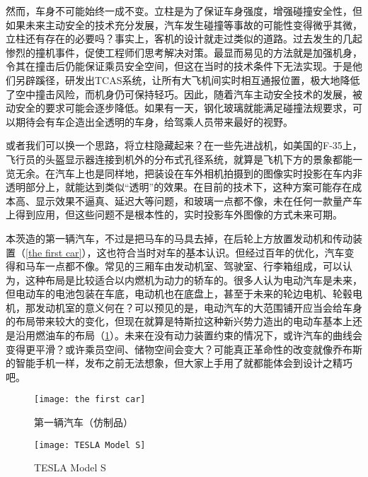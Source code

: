 \documentclass[UTF8]{ctexart}
\numberwithin{figure}{section}
\numberwithin{table}{section}
\begin{document}
然而，车身不可能始终一成不变。立柱是为了保证车身强度，增强碰撞安全性，但如果未来主动安全的技术充分发展，汽车发生碰撞等事故的可能性变得微乎其微，立柱还有存在的必要吗？事实上，客机的设计就走过类似的道路。过去发生的几起惨烈的撞机事件，促使工程师们思考解决对策。最显而易见的方法就是加强机身，令其在撞击后仍能保证乘员安全空间，但这在当时的技术条件下无法实现。于是他们另辟蹊径，研发出TCAS系统，让所有大飞机间实时相互通报位置，极大地降低了空中撞击风险，而机身仍可保持轻巧。因此，随着汽车主动安全技术的发展，被动安全的要求可能会逐步降低。如果有一天，钢化玻璃就能满足碰撞法规要求，可以期待会有车企造出全透明的车身，给驾乘人员带来最好的视野。

或者我们可以换一个思路，将立柱隐藏起来？在一些先进战机，如美国的F-35上，飞行员的头盔显示器连接到机外的分布式孔径系统，就算是飞机下方的景象都能一览无余。在汽车上也是同样地，把装设在车外相机拍摄到的图像实时投影在车内非透明部分上，就能达到类似“透明”的效果。在目前的技术下，这种方案可能存在成本高、显示效果不逼真、延迟大等问题，和玻璃一点都不像，未在任何一款量产车上得到应用，但这些问题不是根本性的，实时投影车外图像的方式未来可期。

本茨造的第一辆汽车，不过是把马车的马具去掉，在后轮上方放置发动机和传动装置（\cref{the first car}），这也符合当时对车的基本认识。但经过百年的优化，汽车变得和马车一点都不像。常见的三厢车由发动机室、驾驶室、行李箱组成，可以认为，这种布局是比较适合以内燃机为动力的轿车的。很多人认为电动汽车是未来，但电动车的电池包装在车底，电动机也在底盘上，甚至于未来的轮边电机、轮毂电机，那发动机室的意义何在？可以预见的是，电动汽车的大范围铺开应当会给车身的布局带来较大的变化，但现在就算是特斯拉这种新兴势力造出的电动车基本上还是沿用燃油车的布局（\cref{TESLA Model S}）。未来在没有动力装置约束的情况下，或许汽车的曲线会变得更平滑？或许乘员空间、储物空间会变大？可能真正革命性的改变就像乔布斯的智能手机一样，发布之前无法想象，但大家上手用了就都能体会到设计之精巧吧。

\begin{figure}[htbp]
	\centering
	\begin{minipage}[b]{0.4\textwidth}
		\centering
		\texttt{[image: the first car]}
		\caption{第一辆汽车（仿制品）}
		\label{the first car}
	\end{minipage}
	\begin{minipage}[b]{0.55\textwidth}
		\centering
		\texttt{[image: TESLA Model S]}
		\caption{TESLA Model S}
		\label{TESLA Model S}
	\end{minipage}
\end{figure}
\end{document}
